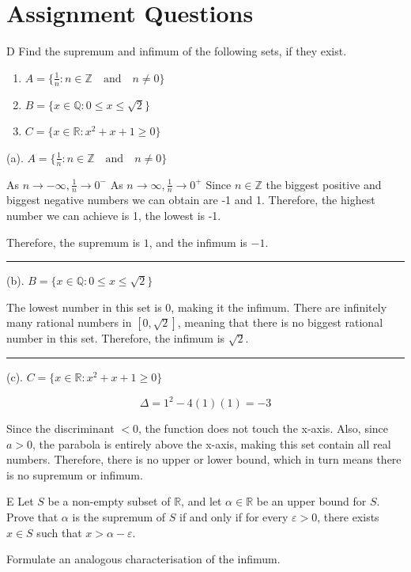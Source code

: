 \documentclass[]{article}
\begin{document}
\section{Assignment Questions}
\begin{question}{D}
    Find the supremum and infimum of the following sets, if they exist.
    \begin{center}
        \begin{enumerate}[label=(\alph*)]
            \item $A = \{\frac{1}{n} : n \in \mathbb{Z} \quad \text{and} \quad n \ne 0\}$
            \item $B = \{x \in \mathbb{Q}: 0 \le x \le \sqrt{2}\}$
            \item $C = \{x \in \mathbb{R}: x^2 + x + 1 \ge 0\}$
        \end{enumerate}
    \end{center}
\end{question}

(a). $A = \{\frac{1}{n} : n \in \mathbb{Z} \quad \text{and} \quad n \ne 0\}$

As $n \to -\infty, \frac{1}{n} \to 0^-$
As $n \to \infty, \frac{1}{n} \to 0^+$
Since $n \in \mathbb{Z}$ the biggest positive and biggest negative numbers we can obtain
are -1 and 1. Therefore, the highest number we can achieve is 1, the lowest is -1.

Therefore, the supremum is $1$, and the infimum is $-1$.
\vspace{0.1in}
\hrule
\vspace{0.1in}
(b). $B = \{x \in \mathbb{Q}: 0 \le x \le \sqrt{2}\}$

The lowest number in this set is 0, making it the infimum. There are infinitely many
rational numbers in $[0, \sqrt{2}]$, meaning that there is no biggest rational number in this set.
Therefore, the infimum is $\sqrt{2}$.
\vspace{0.1in}
\hrule
\vspace{0.1in}

(c). $C = \{x \in \mathbb{R}: x^2 + x + 1 \ge 0\}$

\[
    \Delta = 1^2 - 4(1)(1) = -3
\]

Since the discriminant $< 0$, the function does not touch the x-axis. Also, since $a > 0$, the parabola is entirely above the x-axis, 
making this set contain all real numbers. Therefore, there is no
upper or lower bound, which in turn means there is no supremum or infimum.

\begin{question}{E}
     Let $S$ be a non-empty subset of $\mathbb{R}$, and let $\alpha \in \mathbb{R}$ be an upper bound
for $S$. Prove that $\alpha$ is the supremum of $S$ if and only if for every $\varepsilon > 0$,
there exists $x \in S$ such that $x > \alpha - \varepsilon$.

Formulate an analogous characterisation of the infimum.
\end{question}
\end{document}
